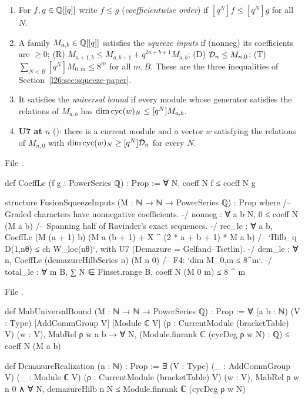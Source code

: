 \begin{definition}\label{l26:def:squeezeinputs}
\begin{enumerate}
\item[(a)] For $f,g\in{\mathbb{Q}}[[q]]$ write $f\le g$ (\emph{coefficientwise order}) if $[q^N]f\le[q^N]g$ for all $N$.
\item[(b)] A family $M_{a,b}\in{\mathbb{Q}}[[q]]$ satisfies the \emph{squeeze inputs} if (nonneg) its coefficients are $\ge0$;
(R) $M_{a+1,b}\le M_{a,b+1}+q^{2a+b+1}M_{a,b}$; (D) $\mathcal D_n\le M_{n,0}$; (T) $\sum_{N<B}[q^N]M_{0,m}\le8^m$ for all
$m,B$. These are the three inequalities of Section~\ref{l26:sec:squeeze-paper}.
\item[(c)] It satisfies the \emph{universal bound} if every module whose generator satisfies the relations of $M_{a,b}$ has
$\dim\operatorname{cyc}(w)_N\le[q^N]M_{a,b}$.
\item[(d)] \textbf{U7 at $n$} (): there is a current module and a vector $w$ satisfying the
relations of $M_{n,0}$ with $\dim\operatorname{cyc}(w)_N\ge[q^N]\mathcal D_n$ for every $N$.
\end{enumerate}
\end{definition}
\noindent File .
\begin{leancode}
def CoeffLe (f g : PowerSeries ℚ) : Prop := ∀ N, coeff N f ≤ coeff N g

structure FusionSqueezeInputs (M : ℕ → ℕ → PowerSeries ℚ) : Prop where
  /-- Graded characters have nonnegative coefficients. -/
  nonneg : ∀ a b N, 0 ≤ coeff N (M a b)
  /-- Spanning half of Ravinder's exact sequences. -/
  rec_le : ∀ a b, CoeffLe (M (a + 1) b) (M a (b + 1) + X ^ (2 * a + b + 1) * M a b)
  /-- `Hilb_q D(1,nθ) ≤ ch W_loc(nθ)`, with U7 (Demazure = Gelfand–Tsetlin). -/
  dem_le : ∀ n, CoeffLe (demazureHilbSeries n) (M n 0)
  /-- F4: `dim M_{0,m} ≤ 8^m`. -/
  total_le : ∀ m B, ∑ N ∈ Finset.range B, coeff N (M 0 m) ≤ 8 ^ m
\end{leancode}
\noindent File .
\begin{leancode}
def MabUniversalBound (M : ℕ → ℕ → PowerSeries ℚ) : Prop :=
  ∀ (a b : ℕ) (V : Type) [AddCommGroup V] [Module ℂ V] (ρ : CurrentModule (bracketTable) V)
    (w : V), MabRel ρ w a b → ∀ N, (Module.finrank ℂ (cycDeg ρ w N) : ℚ) ≤ coeff N (M a b)

def DemazureRealization (n : ℕ) : Prop :=
  ∃ (V : Type) (_ : AddCommGroup V) (_ : Module ℂ V) (ρ : CurrentModule (bracketTable) V) (w : V),
    MabRel ρ w n 0 ∧ ∀ N, demazureHilb n N ≤ Module.finrank ℂ (cycDeg ρ w N)
\end{leancode}

